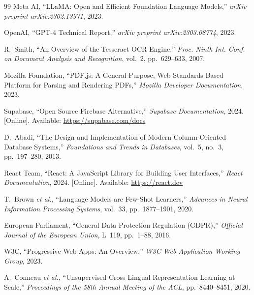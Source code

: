 \documentclass[12pt,a4paper,oneside]{report}
\begin{document}
\begin{thebibliography}{99}
 Meta AI, ``LLaMA: Open and Efficient Foundation Language Models,'' \textit{arXiv preprint arXiv:2302.13971}, 2023.

 OpenAI, ``GPT-4 Technical Report,'' \textit{arXiv preprint arXiv:2303.08774}, 2023.

 R.~Smith, ``An Overview of the Tesseract OCR Engine,'' \textit{Proc. Ninth Int. Conf. on Document Analysis and Recognition}, vol.~2, pp.~629--633, 2007.

 Mozilla Foundation, ``PDF.js: A General-Purpose, Web Standards-Based Platform for Parsing and Rendering PDFs,'' \textit{Mozilla Developer Documentation}, 2023.

 Supabase, ``Open Source Firebase Alternative,'' \textit{Supabase Documentation}, 2024. [Online]. Available: \url{https://supabase.com/docs}

 D.~Abadi, ``The Design and Implementation of Modern Column-Oriented Database Systems,'' \textit{Foundations and Trends in Databases}, vol.~5, no.~3, pp.~197--280, 2013.

 React Team, ``React: A JavaScript Library for Building User Interfaces,'' \textit{React Documentation}, 2024. [Online]. Available: \url{https://react.dev}

 T.~Brown \textit{et al.}, ``Language Models are Few-Shot Learners,'' \textit{Advances in Neural Information Processing Systems}, vol.~33, pp.~1877--1901, 2020.

 European Parliament, ``General Data Protection Regulation (GDPR),'' \textit{Official Journal of the European Union}, L~119, pp.~1--88, 2016.

 W3C, ``Progressive Web Apps: An Overview,'' \textit{W3C Web Application Working Group}, 2023.

 A.~Conneau \textit{et al.}, ``Unsupervised Cross-Lingual Representation Learning at Scale,'' \textit{Proceedings of the 58th Annual Meeting of the ACL}, pp.~8440--8451, 2020.

\end{thebibliography}

\end{document}
